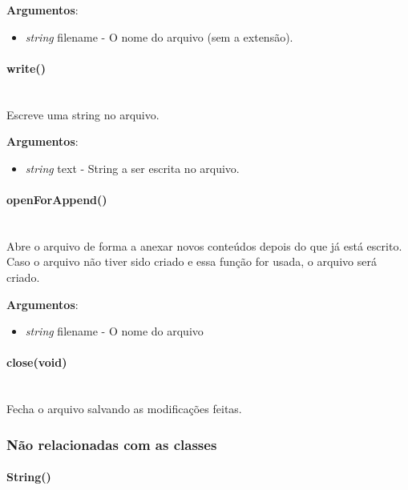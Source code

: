 \documentclass{article}
\begin{document}
\textbf{Argumentos}:

\begin{itemize}
    \item \emph{string} filename - O nome do arquivo (sem a extensão).
\end{itemize}

\paragraph{write()}\mbox{}\\

Escreve uma string no arquivo.

\textbf{Argumentos}:

\begin{itemize}
    \item \emph{string} text - String a ser escrita no arquivo.
\end{itemize}

\paragraph{openForAppend()}\mbox{}\\

Abre o arquivo de forma a anexar novos conteúdos depois do que já está escrito. Caso o arquivo não tiver sido criado e essa função for usada, o arquivo será criado.

\textbf{Argumentos}:

\begin{itemize}
    \item \emph{string} filename - O nome do arquivo
\end{itemize}

\paragraph{close(void)}\mbox{}\\

Fecha o arquivo salvando as modificações feitas.

\subsubsection{Não relacionadas com as classes}

\paragraph{String()}\mbox{}\\
\end{document}
